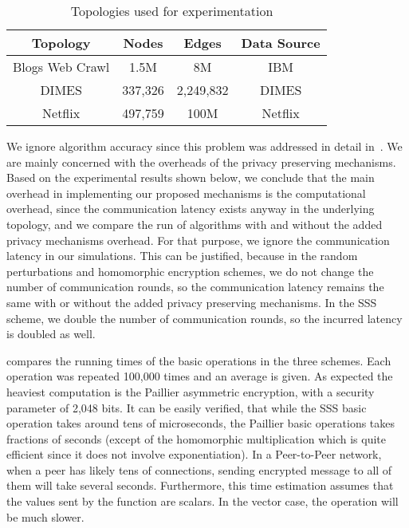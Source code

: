 \documentclass[10pt]{svjour3}
\begin{document}
\begin{table}[h!]
\begin{center}
\begin{tabular}{|c|c|c|c|}
  \hline
Topology & Nodes & Edges & Data Source \\
  \hline
  Blogs Web Crawl & 1.5M & 8M & IBM \\
  DIMES & 337,326  & 2,249,832 & DIMES  \\
  Netflix & 497,759 & 100M & Netflix \\
  \hline
\end{tabular}
\caption{\mbox{              } Topologies used for
experimentation}
\end{center}
\end{table}\label{tb1}
\vspace{-5mm}


We ignore algorithm accuracy since this problem was addressed in
detail in~\cite{KorenCF}. We are mainly concerned with the
overheads of the privacy preserving mechanisms. Based on the
experimental results shown below, we conclude that the main
overhead in implementing our proposed mechanisms is the
computational overhead, since the communication latency exists
anyway in the underlying topology, and we compare the run of
algorithms with and without the added privacy mechanisms overhead.
For that purpose, we ignore the communication latency in our
simulations. This can be justified, because in the random
perturbations and homomorphic encryption schemes, we do not change
the number of communication rounds, so the communication latency
remains the same with or without the added privacy preserving
mechanisms. In the SSS scheme, we double the number of
communication rounds, so the incurred latency is doubled as well.

 compares the running times of the basic operations in the
three schemes. Each operation was repeated 100,000 times and an
average is given. As expected the heaviest computation is the
Paillier asymmetric encryption, with a security parameter of 2,048
bits. It can be easily verified, that while the SSS basic
operation takes around tens of microseconds, the Paillier basic
operations takes fractions of seconds (except of the homomorphic
multiplication which is quite efficient since it does not involve
exponentiation). In a Peer-to-Peer network, when a peer has likely
tens of connections, sending encrypted message to all of them will
take several seconds. Furthermore, this time estimation assumes
that the values sent by the function are scalars. In the vector
case, the operation will be much slower.
\end{document}
